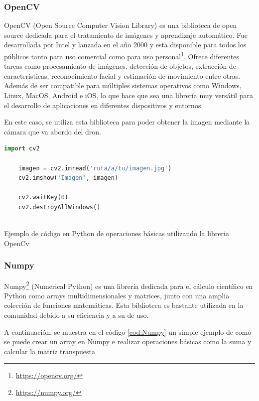 \subsubsection{OpenCV}
\label{sec:OpenCV}
OpenCV (Open Source Computer Vision Library) es una biblioteca de open source dedicada para el tratamiento de imágenes y aprendizaje automático. Fue desarrollada por Intel y lanzada en 
el año 2000 y esta disponible para todos los públicos tanto para uso comercial como para uso personal\footnote{\url{https://opencv.org/}}.
Ofrece diferentes tareas como procesamiento de imágenes, detección de objetos, extracción de características, reconocimiento facial y estimación de movimiento entre otras. Además de ser
compatible para múltiples sistemas operativos como Windows, Linux, MacOS, Android e iOS, lo que hace que sea una librería muy versátil para el desarrollo de aplicaciones en diferentes
dispositivos y entornos. 

En este caso, se utiliza esta biblioteca para poder obtener la imagen mediante la cámara que va abordo del dron.

\begin{code}[h]
  \begin{lstlisting}[language=Python]
    import cv2

    imagen = cv2.imread('ruta/a/tu/imagen.jpg')
    cv2.imshow('Imagen', imagen)
    
    cv2.waitKey(0)
    cv2.destroyAllWindows()
    
  \end{lstlisting}
  \caption[Ejemplo de código en Python de operaciones básicas utilizando la librería OpenCv]{Ejemplo de código en Python de operaciones básicas utilizando la libreria OpenCv}
  \label{cod:Numpy}
  \end{code}  

\subsubsection{Numpy}
\label{sec:Numpy}

Numpy\footnote{\url{https://numpy.org/}} (Numerical Python) es una librería dedicada para el cálculo científico en Python como arrays multidimensionales y matrices, junto con una amplia
colección de funciones matemáticas. Esta biblioteca es bastante utilizada en la comunidad debido a su eficiencia y a su de uso. 

A continuación, se muestra en el código \ref{cod:Numpy} un simple ejemplo de como se puede crear un array en Numpy e realizar operaciones básicas como la suma y calcular la matriz transpuesta

